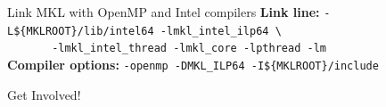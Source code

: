 \documentclass[final,t]{beamer}
\begin{document}
\begin{frame}[fragile]{}
\begin{columns}[t]
\begin{column}{.32\linewidth}
 
      \begin{block}{Link MKL with OpenMP and Intel compilers}
      \textbf{Link line:} \verb|-L${MKLROOT}/lib/intel64 -lmkl_intel_ilp64 \|\\
      \verb|       -lmkl_intel_thread -lmkl_core -lpthread -lm|\\
      \textbf{Compiler options: } \verb|-openmp -DMKL_ILP64 -I${MKLROOT}/include|
      \end{block}
 
 
      \begin{block}{Get Involved!}
      \end{block}
 

     \end{column}

    
    \begin{column}{.32\linewidth}
    

\end{column}
\end{columns}
\end{frame}
\end{document}
